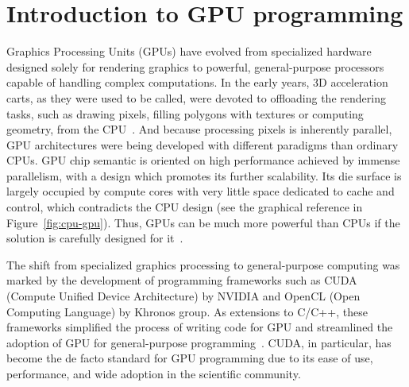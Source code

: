 \section{Introduction to GPU programming}
\label{sec:gpu_intro}


Graphics Processing Units (GPUs) have evolved from specialized hardware designed solely for rendering graphics to powerful, general-purpose processors capable of handling complex computations. In the early years, 3D acceleration carts, as they were used to be called, were devoted to offloading the rendering tasks, such as drawing pixels, filling polygons with textures or computing geometry, from the CPU~\cite{pratx2011gpu}. And because processing pixels is inherently parallel, GPU architectures were being developed with different paradigms than ordinary CPUs. GPU chip semantic is oriented on high performance achieved by immense parallelism, with a design which promotes its further scalability. Its die surface is largely occupied by compute cores with very little space dedicated to cache and control, which contradicts the CPU design (see the graphical reference in Figure~\ref{fig:cpu-gpu}). Thus, GPUs can be much more powerful than CPUs if the solution is carefully designed for it~\cite{navarro2014survey}.

The shift from specialized graphics processing to general-purpose computing was marked by the development of programming frameworks such as CUDA (Compute Unified Device Architecture) by NVIDIA and OpenCL (Open Computing Language) by Khronos group. As extensions to C/C++, these frameworks simplified the process of writing code for GPU and streamlined the adoption of GPU for general-purpose programming~\cite{croix2009introduction}. CUDA, in particular, has become the de facto standard for GPU programming due to its ease of use, performance, and wide adoption in the scientific community.

